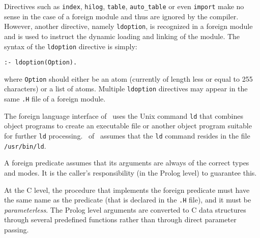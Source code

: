 Directives such as {\tt index}, {\tt hilog}, {\tt table}, {\tt auto\_table} 
or even {\tt import} make no sense in the case of a foreign module and thus 
are ignored by the compiler.  However, another directive, namely 
{\tt ldoption}, is recognized in a foreign module and is used to instruct 
the dynamic loading and linking of the module.  
The syntax of the {\tt ldoption} directive is simply:
\begin{center}
{\tt  :- ldoption(Option).    }
\end{center}
where {\tt Option} should either be an atom (currently of length less
or equal to 255 characters) or a list of atoms.  Multiple {\tt ldoption}
directives may appear in the same {\tt .H} file of a foreign module.

The foreign language interface of \ourprolog\ uses the Unix command 
{\tt ld} that combines object programs to create an executable file  
or another object program suitable for further {\tt ld} processing.
\version\ of \ourprolog\ assumes that the {\tt ld} command resides
in the file {\tt /usr/bin/ld}.

A foreign predicate assumes that its arguments are always of the correct 
types and modes. It is the caller's responsibility (in the Prolog level) 
to guarantee this.

At the C level, the procedure that implements the foreign predicate
must have the same name as the predicate (that is declared in the 
{\tt *.H} file), and it must be {\em parameterless}.  The Prolog level 
arguments are converted to C data structures through several 
predefined functions rather than through direct parameter passing.

